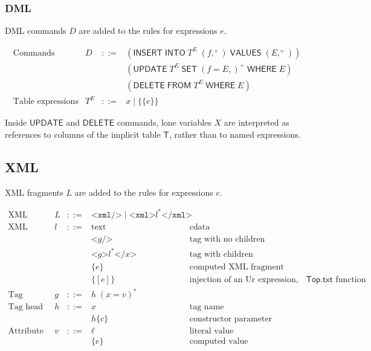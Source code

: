 \documentclass{article}
\newcommand{\mt}[1]{\mathsf{#1}}
\begin{document}
\subsubsection{DML}

DML commands $D$ are added to the rules for expressions $e$.

$$\begin{array}{rrcll}
  \textrm{Commands} & D &::=& (\mt{INSERT} \; \mt{INTO} \; T^E \; (f,^+) \; \mt{VALUES} \; (E,^+)) \\
  &&& (\mt{UPDATE} \; T^E \; \mt{SET} \; (f = E,)^+ \; \mt{WHERE} \; E) \\
  &&& (\mt{DELETE} \; \mt{FROM} \; T^E \; \mt{WHERE} \; E) \\
  \textrm{Table expressions} & T^E &::=& x \mid \{\{e\}\}
\end{array}$$

Inside $\mt{UPDATE}$ and $\mt{DELETE}$ commands, lone variables $X$ are interpreted as references to columns of the implicit table $\mt{T}$, rather than to named expressions.

\subsection{XML}

XML fragments $L$ are added to the rules for expressions $e$.

$$\begin{array}{rrcll}
  \textrm{XML fragments} & L &::=& \texttt{<xml/>} \mid \texttt{<xml>}l^*\texttt{</xml>} \\
  \textrm{XML pieces} & l &::=& \textrm{text} & \textrm{cdata} \\
  &&& \texttt{<}g\texttt{/>} & \textrm{tag with no children} \\
  &&& \texttt{<}g\texttt{>}l^*\texttt{</}x\texttt{>} & \textrm{tag with children} \\
  &&& \{e\} & \textrm{computed XML fragment} \\
  &&& \{[e]\} & \textrm{injection of an Ur expression, via the $\mt{Top}.\mt{txt}$ function} \\
  \textrm{Tag} & g &::=& h \; (x = v)^* \\
  \textrm{Tag head} & h &::=& x & \textrm{tag name} \\
  &&& h\{c\} & \textrm{constructor parameter} \\
  \textrm{Attribute value} & v &::=& \ell & \textrm{literal value} \\
  &&& \{e\} & \textrm{computed value} \\
\end{array}$$
\end{document}
